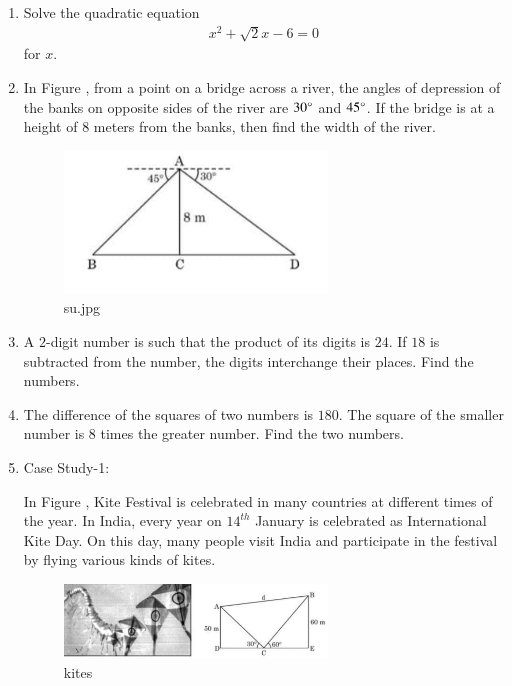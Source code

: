 \documentclass{article}
\theoremstyle{remark}
\begin{document}
\begin{enumerate}
    \item Solve the quadratic equation 
    \begin{align}
        x^2 + \sqrt{2}x - 6 = 0
    \end{align}
    for $x$.
    
    \item In Figure , from a point on a bridge across a river, the angles of depression of the banks on opposite sides of the river are $30\degree$ and $45\degree$. If the bridge is at a height of $8$ meters from the banks, then find the width of the river.
    \begin{figure}[H]
        \centering
        \includegraphics[width=70mm]{figs/su.jpeg}
        \caption{su.jpg}
        \label{fig:su.jpeg}
    \end{figure}
    
    \item A $2$-digit number is such that the product of its digits is $24$. If $18$ is subtracted from the number, the digits interchange their places. Find the numbers.
    
    \item The difference of the squares of two numbers is $180$. The square of the smaller number is $8$ times the greater number. Find the two numbers.
    
    \item Case Study-1:
    
    In Figure , Kite Festival is celebrated in many countries at different times of the year. In India, every year on $14^{th}$ January is celebrated as International Kite Day. On this day, many people visit India and participate in the festival by flying various kinds of kites.
    
    \begin{figure}[H]
	\centering
        \includegraphics[width=70mm]{figs/kite.jpeg}
        \caption{kites}
        \label{fig:kite.jpeg}
    \end{figure}
    

\end{enumerate}
\end{document}
